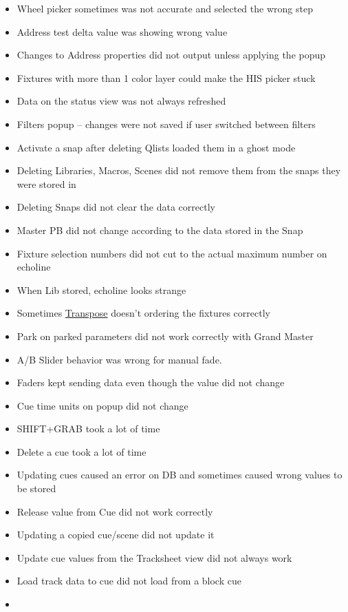 \documentclass[
]{article}
\begin{document}
\begin{itemize}
\item
  Wheel picker sometimes was not accurate and selected the wrong step
\item
  Address test delta value was showing wrong value
\item
  Changes to Address properties did not output unless applying the popup
\item
  Fixtures with more than 1 color layer could make the HIS picker stuck
\item
  Data on the status view was not always refreshed
\item
  Filters popup -- changes were not saved if user switched between filters
\item
  Activate a snap after deleting Qlists loaded them in a ghost mode
\item
  Deleting Libraries, Macros, Scenes did not remove them from the snaps they were stored in
\item
  Deleting Snaps did not clear the data correctly
\item
  Master PB did not change according to the data stored in the Snap
\item
  Fixture selection numbers did not cut to the actual maximum number on echoline
\item
  When Lib stored, echoline looks strange
\item
  Sometimes \protect\hyperlink{transpose}{Transpose} doesn't ordering the fixtures correctly
\item
  Park on parked parameters did not work correctly with Grand Master
\item
  A/B Slider behavior was wrong for manual fade.
\item
  Faders kept sending data even though the value did not change
\item
  Cue time units on popup did not change
\item
  SHIFT+GRAB took a lot of time
\item
  Delete a cue took a lot of time
\item
  Updating cues caused an error on DB and sometimes caused wrong values to be stored
\item
  Release value from Cue did not work correctly
\item
  Updating a copied cue/scene did not update it
\item
  Update cue values from the Tracksheet view did not always work
\item
  Load track data to cue did not load from a block cue
\item

\end{itemize}
\end{document}
